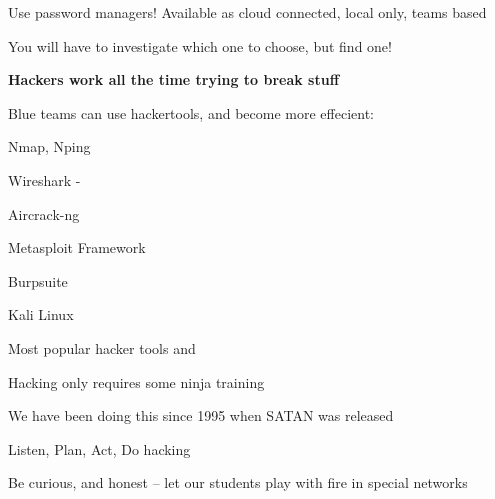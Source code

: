 \documentclass[Screen16to9,17pt]{foils}
\begin{document}


\begin{list2}
\item Use password managers! Available as cloud connected, local only, teams based
\item You will have to investigate which one to choose, but find one!
\end{list2}







{\Large\bf Hackers work all the time trying to break stuff}

Blue teams can use hackertools, and become more effecient:
\begin{list2}
\item Nmap, Nping 
\item Wireshark - 
\item Aircrack-ng 
\item Metasploit Framework 
\item Burpsuite 
\item Kali Linux 
\end{list2}

\vskip 5mm
\centerline{Most popular hacker tools  and }




\begin{list2}
\item Hacking only requires some ninja training
\item We have been doing this since 1995 when SATAN was released
\item Listen, Plan, Act, Do hacking
\item Be curious, and honest -- let our students play with fire in special networks
\end{list2}



\end{document}
